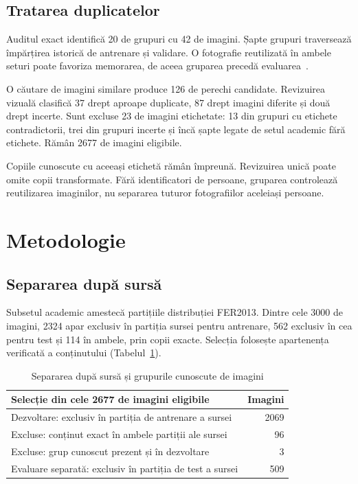 \documentclass[conference]{IEEEtran}
\begin{document}
\subsection{Tratarea duplicatelor}
Auditul exact identifică 20 de grupuri cu 42 de imagini. Șapte grupuri traversează împărțirea istorică de antrenare și validare. O fotografie reutilizată în ambele seturi poate favoriza memorarea, de aceea gruparea precedă evaluarea~\cite{duplicates}.

O căutare de imagini similare produce 126 de perechi candidate. Revizuirea vizuală clasifică 37 drept aproape duplicate, 87 drept imagini diferite și două drept incerte. Sunt excluse 23 de imagini etichetate: 13 din grupuri cu etichete contradictorii, trei din grupuri incerte și încă șapte legate de setul academic fără etichete. Rămân 2677 de imagini eligibile.

Copiile cunoscute cu aceeași etichetă rămân împreună. Revizuirea unică poate omite copii transformate. Fără identificatori de persoane, gruparea controlează reutilizarea imaginilor, nu separarea tuturor fotografiilor aceleiași persoane.

\section{Metodologie}
\subsection{Separarea după sursă}
Subsetul academic amestecă partițiile distribuției FER2013. Dintre cele 3000 de imagini, 2324 apar exclusiv în partiția sursei pentru antrenare, 562 exclusiv în cea pentru test și 114 în ambele, prin copii exacte. Selecția folosește apartenența verificată a conținutului (Tabelul~\ref{tab:selectie}).

\begin{table}[!t]
\caption{Separarea după sursă și grupurile cunoscute de imagini}
\label{tab:selectie}
\centering\footnotesize
\begin{tabular}{p{}r}\toprule
Selecție din cele 2677 de imagini eligibile & Imagini \\\midrule
Dezvoltare: exclusiv în partiția de antrenare a sursei & 2069 \\
Excluse: conținut exact în ambele partiții ale sursei & 96 \\
Excluse: grup cunoscut prezent și în dezvoltare & 3 \\
Evaluare separată: exclusiv în partiția de test a sursei & 509 \\\bottomrule
\end{tabular}
\end{table}
\end{document}
